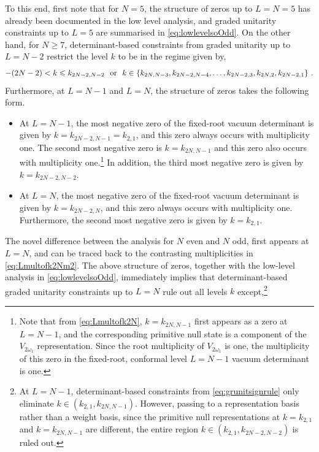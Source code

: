 To this end, first note that for $N = 5$, the structure of zeros up to $L = N = 5$ has already been documented in the low level analysis, and graded unitarity constraints up to $L = 5$ are summarised in \eqref{eq:lowlevelsoOdd}. On the other hand, for $N \geqslant 7$, determinant-based constraints from graded unitarity up to $L = N-2$ restrict the level $k$ to be in the regime given by,
\begin{equation} \label{eq:constSOodduptoNm2}
\scalebox{0.93}{$\displaystyle
    -(2N-2) < k \leqslant k_{2N-2, N-2} \ \ \text{or} \ \ k \in \{k_{2N, N-3}, k_{2N-2, N-4}, \ldots, k_{2N-2, 3}, k_{2N, 2}, k_{2N-2,1}\}~.
$}
\end{equation}
Furthermore, at $L = N-1$ and $L = N$, the structure of zeros takes the following form.
\begin{itemize}
    \item At $L = N-1$, the most negative zero of the fixed-root vacuum determinant is given by $k = k_{2N-2, N-1} = k_{2,1}$, and this zero always occurs with multiplicity one. The second most negative zero is $k = k_{2N,N-1}$ and this zero also occurs with multiplicity one.\footnote{Note that from \eqref{eq:Lmultofk2N}, $k = k_{2N,N-1}$ first appears as a zero at $L = N-1$, and the corresponding primitive null state is a component of the $V_{2\omega_1}$ representation. Since the root multiplicity of $V_{2\omega_1}$ is one, the multiplicity of this zero in the fixed-root, conformal level $L=N-1$ vacuum determinant is one.} In addition, the third most negative zero is given by $k = k_{2N-2, N-2}$.  
    \item At $L = N$, the most negative zero of the fixed-root vacuum determinant is given by $k = k_{2N-2,N}$, and this zero always occurs with multiplicity one. Furthermore, the second most negative zero is given by $k = k_{2, 1}$.  
\end{itemize}
The novel difference between the analysis for $N$ even and $N$ odd, first appears at $L = N$, and can be traced back to the contrasting multiplicities in \eqref{eq:Lmultofk2Nm2}. The above structure of zeros, together with the low-level analysis in \eqref{eq:lowlevelsoOdd}, immediately implies that determinant-based graded unitarity constraints up to $L = N$ rule out all levels $k$ except,\footnote{At $L = N-1$, determinant-based constraints from \eqref{eq:grunitsignrule} only eliminate $k \in (k_{2,1}, k_{2N, N-1})$. However, passing to a representation basis rather than a weight basis, since the primitive null representations at $k=k_{2,1}$ and $k = k_{2N,N-1}$ are different, the entire region $k \in (k_{2,1}, k_{2N-2, N-2})$ is ruled out.}
